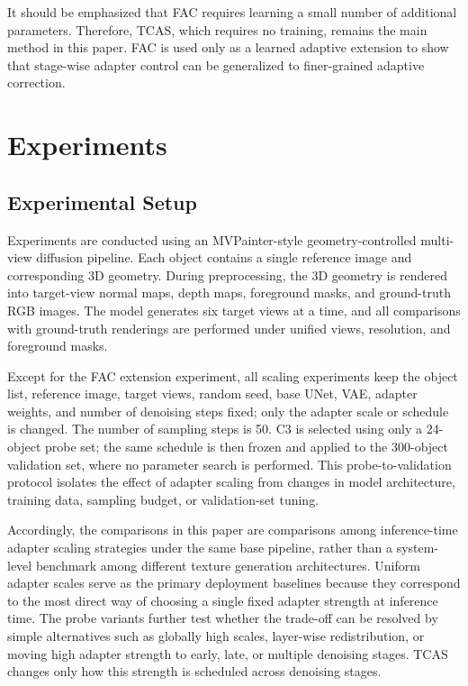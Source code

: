 \documentclass[times,twocolumn,final]{elsarticle}
\begin{document}
It should be emphasized that FAC requires learning a small number of additional parameters. Therefore, TCAS, which requires no training, remains the main method in this paper. FAC is used only as a learned adaptive extension to show that stage-wise adapter control can be generalized to finer-grained adaptive correction.

\section{Experiments}
\label{sec:experiments}

\subsection{Experimental Setup}
\label{subsec:setup}

Experiments are conducted using an MVPainter-style geometry-controlled multi-view diffusion pipeline. Each object contains a single reference image and corresponding 3D geometry. During preprocessing, the 3D geometry is rendered into target-view normal maps, depth maps, foreground masks, and ground-truth RGB images. The model generates six target views at a time, and all comparisons with ground-truth renderings are performed under unified views, resolution, and foreground masks.

Except for the FAC extension experiment, all scaling experiments keep the object list, reference image, target views, random seed, base UNet, VAE, adapter weights, and number of denoising steps fixed; only the adapter scale or schedule is changed. The number of sampling steps is 50. C3 is selected using only a 24-object probe set; the same schedule is then frozen and applied to the 300-object validation set, where no parameter search is performed. This probe-to-validation protocol isolates the effect of adapter scaling from changes in model architecture, training data, sampling budget, or validation-set tuning.

Accordingly, the comparisons in this paper are comparisons among inference-time adapter scaling strategies under the same base pipeline, rather than a system-level benchmark among different texture generation architectures. Uniform adapter scales serve as the primary deployment baselines because they correspond to the most direct way of choosing a single fixed adapter strength at inference time. The probe variants further test whether the trade-off can be resolved by simple alternatives such as globally high scales, layer-wise redistribution, or moving high adapter strength to early, late, or multiple denoising stages. TCAS changes only how this strength is scheduled across denoising stages.
\end{document}
